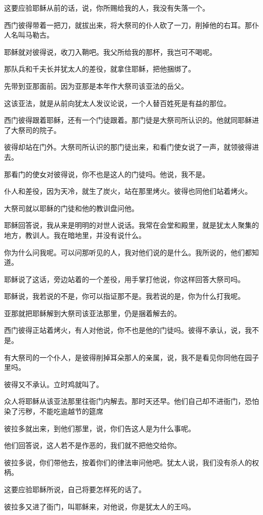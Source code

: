 \documentclass[12pt,oneside]{book}
\begin{document}
这要应验耶稣从前的话，说，你所赐给我的人，我没有失落一个。

西门彼得带着一把刀，就拔出来，将大祭司的仆人砍了一刀，削掉他的右耳。那仆人名叫马勒古。

耶稣就对彼得说，收刀入鞘吧。我父所给我的那杯，我岂可不喝呢。

那队兵和千夫长并犹太人的差役，就拿住耶稣，把他捆绑了。

先带到亚那面前。因为亚那是本年作大祭司该亚法的岳父。

这该亚法，就是从前向犹太人发议论说，一个人替百姓死是有益的那位。

西门彼得跟着耶稣，还有一个门徒跟着。那门徒是大祭司所认识的。他就同耶稣进了大祭司的院子。

彼得却站在门外。大祭司所认识的那门徒出来，和看门使女说了一声，就领彼得进去。

那看门的使女对彼得说，你不也是这人的门徒吗。他说，我不是。

仆人和差役，因为天冷，就生了炭火，站在那里烤火。彼得也同他们站着烤火。

大祭司就以耶稣的门徒和他的教训盘问他。

耶稣回答说，我从来是明明的对世人说话。我常在会堂和殿里，就是犹太人聚集的地方，教训人。我在暗地里，并没有说什么。

你为什么问我呢。可以问那听见的人，我对他们说的是什么。我所说的，他们都知道。

耶稣说了这话，旁边站着的一个差役，用手掌打他说，你这样回答大祭司吗。

耶稣说，我若说的不是，你可以指证那不是。我若说的是，你为什么打我呢。

亚那就把耶稣解到大祭司该亚法那里，仍是捆着解去的。

西门彼得正站着烤火，有人对他说，你不也是他的门徒吗。彼得不承认，说，我不是。

有大祭司的一个仆人，是彼得削掉耳朵那人的亲属，说，我不是看见你同他在园子里吗。

彼得又不承认。立时鸡就叫了。

众人将耶稣从该亚法那里往衙门内解去。那时天还早。他们自己却不进衙门，恐怕染了污秽，不能吃逾越节的筵席

彼拉多就出来，到他们那里，说，你们告这人是为什么事呢。

他们回答说，这人若不是作恶的，我们就不把他交给你。

彼拉多说，你们带他去，按着你们的律法审问他吧。犹太人说，我们没有杀人的权柄。

这要应验耶稣所说，自己将要怎样死的话了。

彼拉多又进了衙门，叫耶稣来，对他说，你是犹太人的王吗。
\end{document}
